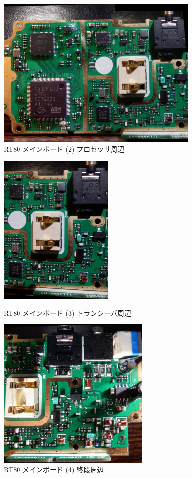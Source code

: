 \documentclass[a4j,oneside]{ujbook}
\begin{document}
\begin{figure}[H]
 \centering
 \includegraphics[width=10cm]{img/pa143682_stitch.jpg}
 \caption{RT80 メインボード (2) プロセッサ周辺}
\end{figure}

\begin{figure}[H]
 \begin{minipage}[t]{0.4\hsize}
  \centering
  \includegraphics[height=7.5cm]{img/pa143684_stitch.jpg}
  \caption{RT80 メインボード (3) トランシーバ周辺}
 \end{minipage}
 \begin{minipage}[t]{0.6\hsize}
  \centering
  \includegraphics[height=7.5cm]{img/pa143686_stitch.jpg}
  \caption{RT80 メインボード (4) 終段周辺}
 \end{minipage}
\end{figure}
\end{document}
